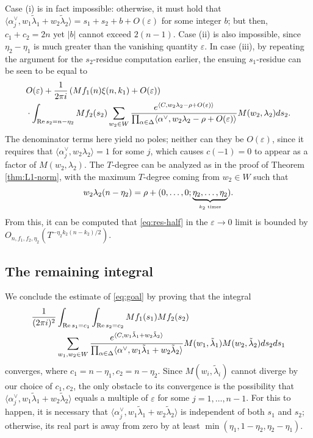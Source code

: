 \documentclass[11pt]{amsart}
\numberwithin{theorem}{section}
\numberwithin{equation}{section}
\theoremstyle{remark}
\theoremstyle{definition}
\newcommand{\re}{\mathrm{Re}\,}
\begin{document}
Case (i) is in fact impossible: otherwise, it must hold that $\langle \alpha^\vee_j, w_1\tilde\lambda_1 + w_2\tilde\lambda_2 \rangle = s_1+s_2+b+O(\varepsilon)$ for some integer $b$; but then, $c_1+c_2 = 2n$ yet $|b|$ cannot exceed $2(n-1)$. Case (ii) is also impossible, since $\eta_2-\eta_1$ is much greater than the vanishing quantity $\varepsilon$. In case (iii), by repeating the argument for the $s_2$-residue computation earlier, the ensuing $s_1$-residue can be seen to be equal to
\begin{align} \label{eq:res-half}
&O(\varepsilon)+\frac{1}{2\pi i}\left(Mf_1(n)\xi(n,k_1) + O(\varepsilon)\right) \\
&\cdot\int_{\re s_2=n-\eta_2} Mf_2(s_2)\sum_{w_2 \in W}\frac{e^{\langle C, w_2\lambda_2-\rho+O(\varepsilon)\rangle}}{\prod_{\alpha \in \Delta}\langle\alpha^\vee,w_2\lambda_2-\rho+O(\varepsilon)\rangle}M(w_2,\lambda_2)ds_2. \notag
\end{align}
The denominator terms here yield no poles; neither can they be $O(\varepsilon)$, since it requires that $\langle\alpha_j^\vee,w_2\lambda_2\rangle=1$ for some $j$, which causes $c(-1)=0$ to appear as a factor of $M(w_2,\lambda_2)$. The $T$-degree can be analyzed as in the proof of Theorem \ref{thm:L1-norm}, with the maximum $T$-degree coming from $w_2 \in W$ such that
\begin{equation*}
w_2\lambda_2(n-\eta_2) = \rho + (0,\ldots,0;\underbrace{\eta_2,\ldots,\eta_2}_{\mbox{\tiny $k_2$ times}}).
\end{equation*}
From this, it can be computed that \eqref{eq:res-half} in the $\varepsilon\rightarrow0$ limit is bounded by $O_{n,f_1,f_2,\eta_2}(T^{-\eta_2 k_2(n-k_2)/2})$.





\subsection{The remaining integral} \label{sec:denom}

We conclude the estimate of \eqref{eq:goal} by proving that the integral
\begin{align} \label{eq:res-remain}
\frac{1}{(2\pi i)^2}&\int_{\re s_1 = c_1}\int_{\re s_2 = c_2} Mf_1(s_1)Mf_2(s_2) \\
&\sum_{w_1,w_2 \in W} \frac{e^{\langle C, w_1\tilde\lambda_1+w_2\tilde\lambda_2 \rangle}}{\prod_{\alpha \in \Delta}\langle \alpha^\vee, w_1\tilde\lambda_1 + w_2\tilde\lambda_2 \rangle} M(w_1,\tilde\lambda_1)M(w_2,\tilde\lambda_2) ds_2 ds_1 \notag
\end{align}
converges, where $c_1= n-\eta_1, c_2=n-\eta_2$. Since $M(w_i,\tilde\lambda_i)$ cannot diverge by our choice of $c_1,c_2$, the only obstacle to its convergence is the possibility that $\langle \alpha^\vee_j, w_1\tilde\lambda_1 + w_2\tilde\lambda_2 \rangle$ equals a multiple of $\varepsilon$ for some $j=1,\ldots,n-1$. For this to happen, it is necessary that $\langle \alpha^\vee_j, w_1\tilde\lambda_1 + w_2\tilde\lambda_2 \rangle$ is independent of both $s_1$ and $s_2$; otherwise, its real part is away from zero by at least $\min(\eta_1,1-\eta_2,\eta_2-\eta_1)$.
\end{document}
